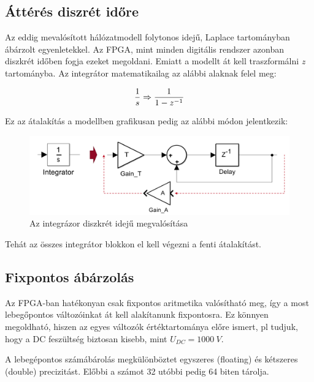\subsection{Áttérés diszrét időre}

Az eddig mevalósított hálózatmodell folytonos idejű, Laplace tartományban ábárzolt egyenletekkel. Az FPGA, mint minden digitális rendszer azonban diszkrét időben fogja ezeket megoldani. Emiatt a modellt át kell traszformálni \emph{z} tartományba. Az integrátor matematikailag az alábbi alaknak felel meg:

\begin{equation}
\centering
\frac{1}{s} \Rightarrow \frac{1}{1-z^{-1}}
\end{equation}

Ez az átalakítás a modellben grafikusan pedig az alábbi módon jelentkezik:

\begin{figure}[h]
	\centering
	\includegraphics[width = \textwidth]{figures/integrator.png}
	\caption{Az integrázor diszkrét idejű megvalósítása} 
	\label{fig:integrator}
\end{figure}

Tehát az összes integrátor blokkon el kell végezni a fenti átalakítást.


\subsection{Fixpontos ábárzolás}

Az FPGA-ban hatékonyan csak fixpontos aritmetika valósítható meg, így a most lebegőpontos változóinkat át kell alakítanunk fixpontosra. Ez könnyen megoldható, hiszen az egyes változók értéktartománya előre ismert, pl tudjuk, hogy a DC feszültség biztosan kisebb, mint $U_{DC}=1000\ V$.

A lebegépontos számábárolás megkülönböztet egyszeres (floating) és kétszeres (double) precizitást. Előbbi a számot 32 utóbbi pedig 64 biten tárolja.


